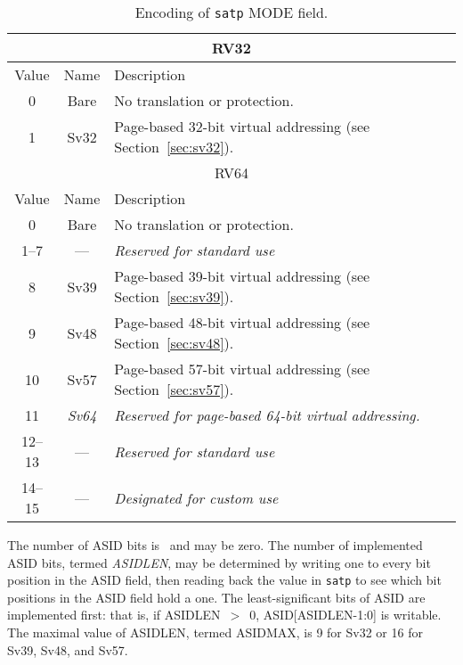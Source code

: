 \begin{table}[h]
\begin{center}
\begin{tabular}{|c|c|l|}
\hline
\multicolumn{3}{|c|}{RV32} \\
\hline
Value  & Name & Description \\
\hline
0       & Bare  & No translation or protection. \\
1       & Sv32  & Page-based 32-bit virtual addressing (see Section~\ref{sec:sv32}). \\
\hline \hline
\multicolumn{3}{|c|}{RV64} \\
\hline
Value  & Name & Description \\
\hline
0       & Bare  & No translation or protection. \\
1--7    & ---   & {\em Reserved for standard use} \\
8       & Sv39  & Page-based 39-bit virtual addressing (see Section~\ref{sec:sv39}). \\
9       & Sv48  & Page-based 48-bit virtual addressing (see Section~\ref{sec:sv48}). \\
10      & Sv57  & Page-based 57-bit virtual addressing (see Section~\ref{sec:sv57}). \\
11      & {\em Sv64} & {\em Reserved for page-based 64-bit virtual addressing.} \\
12--13  & ---   & {\em Reserved for standard use} \\
14--15  & ---   & {\em Designated for custom use} \\
\hline
\end{tabular}
\end{center}
\caption{Encoding of {\tt satp} MODE field.}
\label{tab:satp-mode}
\end{table}

The number of ASID bits is \unspecified\ and may be zero.  The
number of implemented ASID bits, termed {\mbox {\em ASIDLEN}}, may be
determined by writing one to every bit position in the ASID field, then
reading back the value in {\tt satp} to see which bit positions in the ASID
field hold a one.  The least-significant bits of ASID are implemented first:
that is, if ASIDLEN~$>$~0, ASID[ASIDLEN-1:0] is writable.  The maximal value
of ASIDLEN, termed ASIDMAX, is 9 for Sv32 or 16 for Sv39, Sv48, and Sv57.

